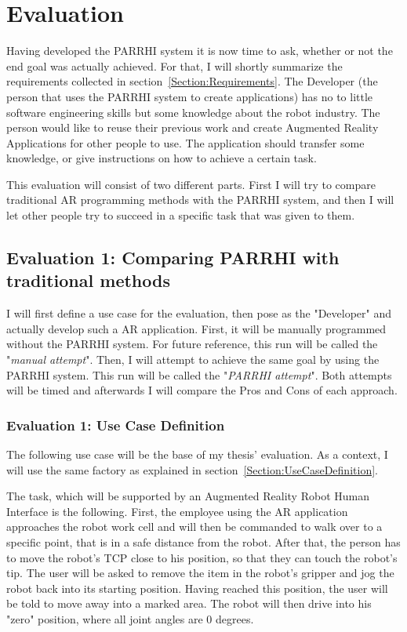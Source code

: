 \chapter{Evaluation}\label{Chap:Evaluation}

Having developed the PARRHI system it is now time to ask, whether or not the end goal was actually achieved. For that, I will shortly summarize the requirements collected in section~\ref{Section:Requirements}. The Developer (the person that uses the PARRHI system to create applications) has no to little software engineering skills but some knowledge about the robot industry. The person would like to reuse their previous work and create Augmented Reality Applications for other people to use. The application should transfer some knowledge, or give instructions on how to achieve a certain task.

This evaluation will consist of two different parts. First I will try to compare traditional AR programming methods with the PARRHI system, and then I will let other people try to succeed in a specific task that was given to them. 

\section{Evaluation 1: Comparing PARRHI with traditional methods}

I will first define a use case for the evaluation, then pose as the "Developer" and actually develop such a AR application. First, it will be manually programmed without the PARRHI system. For future reference, this run will be called the "\textit{manual attempt}". Then, I will attempt to achieve the same goal by using the PARRHI system. This run will be called the "\textit{PARRHI attempt}". Both attempts will be timed and afterwards I will compare the Pros and Cons of each approach.

\subsection{Evaluation 1: Use Case Definition}
The following use case will be the base of my thesis' evaluation. As a context, I will use the same factory as explained in section~\ref{Section:UseCaseDefinition}. 

The task, which will be supported by an Augmented Reality Robot Human Interface is the following. First, the employee using the AR application approaches the robot work cell and will then be commanded to walk over to a specific point, that is in a safe distance from the robot. After that, the person has to move the robot's TCP close to his position, so that they can touch the robot's tip. The user will be asked to remove the item in the robot's gripper and jog the robot back into its starting position. Having reached this position, the user will be told to move away into a marked area. The robot will then drive into his "zero" position, where all joint angles are 0 degrees. 

